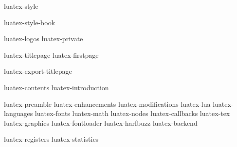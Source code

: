 

\environment luatex-style

\startmode[book]
    \environment luatex-style-book
\stopmode

\environment luatex-logos
\environment luatex-private

\startmode[export]

    \setupbackend
      [export=luatex]

\stopmode

\startdocument
  [manual=Lua\TeX,
   status=stable,
   version=1.20]

\startnotmode[*export]
    \component luatex-titlepage
    \component luatex-firstpage
\stopnotmode

\startmode[*export]
    \component luatex-export-titlepage
\stopmode

\startfrontmatter
    \component luatex-contents
    \component luatex-introduction
\stopfrontmatter

\startbodymatter
    \component luatex-preamble
    \component luatex-enhancements
    \component luatex-modifications
    \component luatex-lua
    \component luatex-languages
    \component luatex-fonts
    \component luatex-math
    \component luatex-nodes
    \component luatex-callbacks
    \component luatex-tex
    \component luatex-graphics
    \component luatex-fontloader
    \component luatex-harfbuzz
    \component luatex-backend
\stopbodymatter

\startbackmatter
    \component luatex-registers
    \component luatex-statistics
\stopbackmatter

\stopdocument
